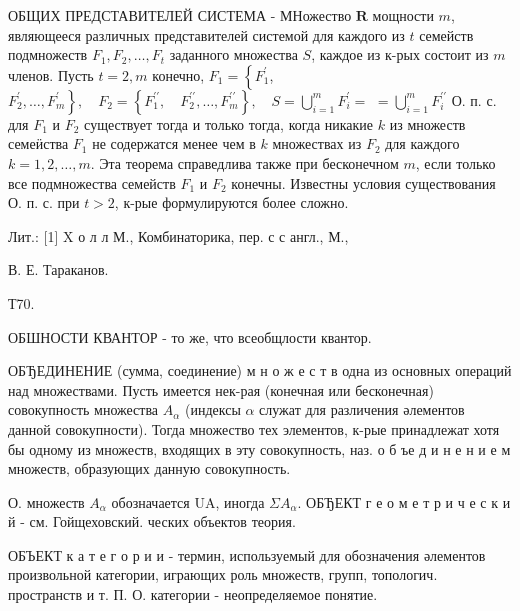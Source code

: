 \documentclass[10pt]{article}
\begin{document}
ОБЩИХ ПРЕДСТАВИТЕЛЕЙ СИСТЕМА - МНожество $\boldsymbol{R}$ мощности $m$, являющееся различных представителей системой для каждого из $t$ семейств подмножеств $F_{1}, F_{2}, \ldots, F_{t}$ заданного множества $S$, каждое из к-рых состоит из $m$ членов. Пусть $t=2, m$ конечно, $F_{1}=\left\{F_{1}^{\prime}\right.$, $\left.F_{2}^{\prime}, \ldots, F_{m}^{\prime}\right\}, \quad F_{2}=\left\{F_{1}^{\prime \prime}, \quad F_{2}^{\prime \prime}, \ldots, F_{m}^{\prime \prime}\right\}, \quad S=\bigcup_{i=1}^{m} F_{i}^{\prime}=$ $=\bigcup_{i=1}^{m} F_{i}^{\prime \prime}$ О. п. с. для $F_{1}$ и $F_{2}$ существует тогда и только тогда, когда никакие $k$ из множеств семеӥства $F_{1}$ не содержатся менее чем в $k$ множествах из $F_{2}$ для каждого $k=1,2, \ldots, m$. Эта теорема справедлива также при бесконечном $m$, если только все подмножества семейств $F_{1}$ и $F_{2}$ конечны. Известны условия существования О. п. с. при $t>2$, к-рые формулируются более сложно.



Лит.: [1] X о л л М., Комбинаторика, пер. с с англ., М.,

В. Е. Тараканов.

Т70.



ОБШНОСТИ КВАНТОР - то же, что всеобщлости квантор.



ОБЂЕДИНЕНИЕ (сумма, соединение) м н о ж е с т в одна из основных операций над множествами. Пусть имеется нек-рая (конечная или бесконечная) совокупность множества $A_{\alpha}$ (индексы $\alpha$ служат для различения әлементов данной совокупности). Тогда множество тех элементов, к-рые принадлежат хотя бы одному из множеств, входящих в эту совокупность, наз. о б ъе д и н е н и е м множеств, образующих данную совокупность.



О. множеств $A_{\alpha}$ обозначается UA, иногда $\Sigma A_{\alpha}$. ОБЂЕКТ г е о м е т р и ч е с к и й - см. Гойщеховский. ческих объектов теория.



ОБЪЕКТ к а т е г о р и и - термин, используемый для обозначения әлементов произвольной категории, играющих роль множеств, групп, топологич. пространств и т. П. О. категории - неопределяемое понятие.
\end{document}
